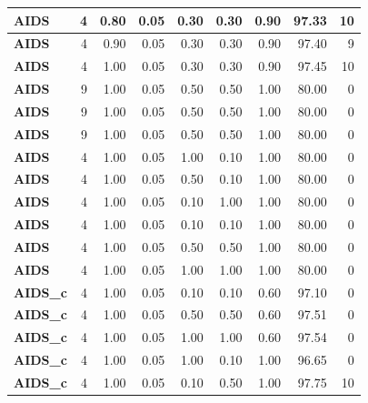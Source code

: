 \begin{longtable}{|l||r|r|r|r|r|r||r|r|}
		\textbf{AIDS} & 4 & 0.80 & 0.05 & 0.30 & 0.30 & 0.90 & 97.33 & 10 \\ \hline
		\textbf{AIDS} & 4 & 0.90 & 0.05 & 0.30 & 0.30 & 0.90 & 97.40 & 9 \\ \hline
		\textbf{AIDS} & 4 & 1.00 & 0.05 & 0.30 & 0.30 & 0.90 & 97.45 & 10 \\ \hline
		\textbf{AIDS} & 9 & 1.00 & 0.05 & 0.50 & 0.50 & 1.00 & 80.00 & 0 \\ \hline
		\textbf{AIDS} & 9 & 1.00 & 0.05 & 0.50 & 0.50 & 1.00 & 80.00 & 0 \\ \hline
		\textbf{AIDS} & 9 & 1.00 & 0.05 & 0.50 & 0.50 & 1.00 & 80.00 & 0 \\ \hline
		\textbf{AIDS} & 4 & 1.00 & 0.05 & 1.00 & 0.10 & 1.00 & 80.00 & 0 \\ \hline
		\textbf{AIDS} & 4 & 1.00 & 0.05 & 0.50 & 0.10 & 1.00 & 80.00 & 0 \\ \hline
		\textbf{AIDS} & 4 & 1.00 & 0.05 & 0.10 & 1.00 & 1.00 & 80.00 & 0 \\ \hline
		\textbf{AIDS} & 4 & 1.00 & 0.05 & 0.10 & 0.10 & 1.00 & 80.00 & 0 \\ \hline
		\textbf{AIDS} & 4 & 1.00 & 0.05 & 0.50 & 0.50 & 1.00 & 80.00 & 0 \\ \hline
		\textbf{AIDS} & 4 & 1.00 & 0.05 & 1.00 & 1.00 & 1.00 & 80.00 & 0 \\ \hline
		\textbf{AIDS\_c} & 4 & 1.00 & 0.05 & 0.10 & 0.10 & 0.60 & 97.10 & 0 \\ \hline
		\textbf{AIDS\_c} & 4 & 1.00 & 0.05 & 0.50 & 0.50 & 0.60 & 97.51 & 0 \\ \hline
		\textbf{AIDS\_c} & 4 & 1.00 & 0.05 & 1.00 & 1.00 & 0.60 & 97.54 & 0 \\ \hline
		\textbf{AIDS\_c} & 4 & 1.00 & 0.05 & 1.00 & 0.10 & 1.00 & 96.65 & 0 \\ \hline
		\textbf{AIDS\_c} & 4 & 1.00 & 0.05 & 0.10 & 0.50 & 1.00 & 97.75 & 10 \\ \hline

\end{longtable}

